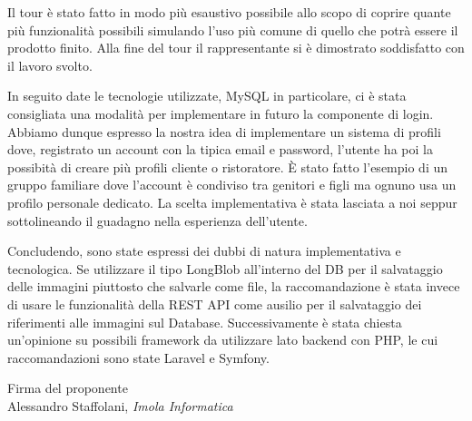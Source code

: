 \documentclass[a4paper, 11pt]{article}
\begin{document}
Il tour è stato fatto in modo più esaustivo possibile allo scopo di coprire quante più funzionalità possibili simulando l'uso più comune di quello che potrà essere il prodotto finito.
Alla fine del tour il rappresentante si è dimostrato soddisfatto con il lavoro svolto.

In seguito date le tecnologie utilizzate, MySQL in particolare, ci è stata consigliata una modalità per implementare in futuro la componente di login. Abbiamo dunque espresso la nostra idea di implementare un sistema di profili dove, registrato un account con la tipica email e password, l'utente ha poi la possibità di creare più profili cliente o ristoratore. È stato fatto l'esempio di un gruppo familiare dove l'account è condiviso tra genitori e figli ma ognuno usa un profilo personale dedicato.
La scelta implementativa è stata lasciata a noi seppur sottolineando il guadagno nella esperienza dell'utente.

Concludendo, sono state espressi dei dubbi di natura implementativa e tecnologica.
Se utilizzare il tipo LongBlob all'interno del DB per il salvataggio delle immagini piuttosto che salvarle come file, la raccomandazione è stata invece di usare le funzionalità della REST API come ausilio per il salvataggio dei riferimenti alle immagini sul Database.
Successivamente è stata chiesta un'opinione su possibili framework da utilizzare lato backend con PHP, le cui raccomandazioni sono state Laravel e Symfony.

\vspace{60pt}
\begin{flushleft}
\hfill Firma del proponente \\
\vspace{50pt}
\hfill Alessandro Staffolani, \textit{Imola Informatica}
\end{flushleft}
\end{document}
